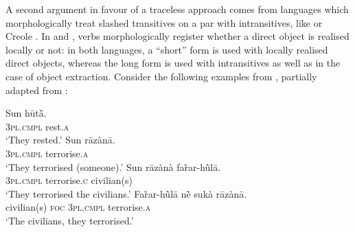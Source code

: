\documentclass[output=paper
,notxmath 
	        ,collection
	        ,collectionchapter
 	        ,biblatex
                ,babelshorthands
                ,newtxmath
                ,draftmode
                ,colorlinks, citecolor=brown
]{langscibook}
\begin{document}
 A second argument in favour of a traceless approach comes from
 languages which morphologically treat slashed transitives on a par
 with intransitives, like  \citep{crysmann_b04yom} or
  Creole  \citep{Henri10}. In 
 and , verbs morphologically register whether a direct
 object is realised locally or not: in both languages, a ``short''
 form is used with locally realised direct objects, whereas the long
 form is used with intransitives as well as in the case of object
 extraction. Consider the following examples from ,
 partially adapted from \citet[632--633]{newman_p00}:

\ea
\gll Sun hūtā̀.\\
  \textsc{3pl.cmpl} rest.\textsc{a}\\
\glt `They rested.' \hfill \label{ex:UDC:Hau:intr}
\z
\eal
\label{ex:UDC:Hau:tr}
    \ex\label{ex:UDC:Hau:tr:a} 
    \gll Sun rāzànā.\footnotemark\\
         \textsc{3pl.cmpl} terrorise.\textsc{a}\\
    \glt `They terrorised (someone).'
    \ex\label{ex:UDC:Hau:tr:b} 
    \gll Sun rāzànà far̃ar-hū̀lā.\footnotemark\\
         \textsc{3pl.cmpl} terrorise.\textsc{c} civilian(s)\\
    \glt `They terrorised the civilians.'
    \ex 
    \gll Far̃ar-hū̀lā nḕ sukà rāzànā.\\
         civilian(s) \textsc{foc} \textsc{3pl.cmpl} terrorise.\textsc{a}\\
    \glt `The civilians, they terrorised.' 
\zl
\end{document}
